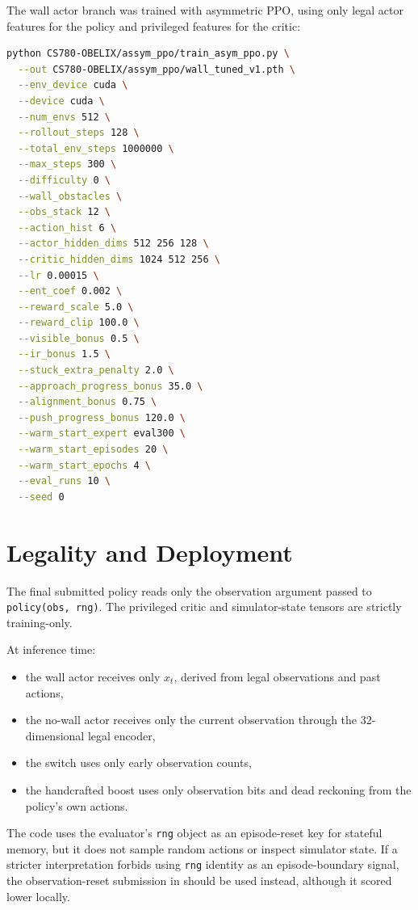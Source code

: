 \documentclass[11pt, oneside]{article}   	%
\begin{document}
The wall actor branch was trained with asymmetric PPO, using only legal actor features
for the policy and privileged features for the critic:

\begin{lstlisting}[language=bash]
python CS780-OBELIX/assym_ppo/train_asym_ppo.py \
  --out CS780-OBELIX/assym_ppo/wall_tuned_v1.pth \
  --env_device cuda \
  --device cuda \
  --num_envs 512 \
  --rollout_steps 128 \
  --total_env_steps 1000000 \
  --max_steps 300 \
  --difficulty 0 \
  --wall_obstacles \
  --obs_stack 12 \
  --action_hist 6 \
  --actor_hidden_dims 512 256 128 \
  --critic_hidden_dims 1024 512 256 \
  --lr 0.00015 \
  --ent_coef 0.002 \
  --reward_scale 5.0 \
  --reward_clip 100.0 \
  --visible_bonus 0.5 \
  --ir_bonus 1.5 \
  --stuck_extra_penalty 2.0 \
  --approach_progress_bonus 35.0 \
  --alignment_bonus 0.75 \
  --push_progress_bonus 120.0 \
  --warm_start_expert eval300 \
  --warm_start_episodes 20 \
  --warm_start_epochs 4 \
  --eval_runs 10 \
  --seed 0
\end{lstlisting}

\section{Legality and Deployment}

The final submitted policy reads only the observation argument passed to
\texttt{policy(obs, rng)}. The privileged critic and simulator-state tensors are strictly
training-only.

At inference time:
\begin{itemize}[leftmargin=1.5em]
  \item the wall actor receives only \(x_t\), derived from legal observations and past
  actions,
  \item the no-wall actor receives only the current observation through the 32-dimensional
  legal encoder,
  \item the switch uses only early observation counts,
  \item the handcrafted boost uses only observation bits and dead reckoning from the
  policy's own actions.
\end{itemize}
The code uses the evaluator's \texttt{rng} object as an episode-reset key for stateful
memory, but it does not sample random actions or inspect simulator state. If a stricter
interpretation forbids using \texttt{rng} identity as an episode-boundary signal, the
observation-reset submission in  should be used instead, although it
scored lower locally.
\end{document}
